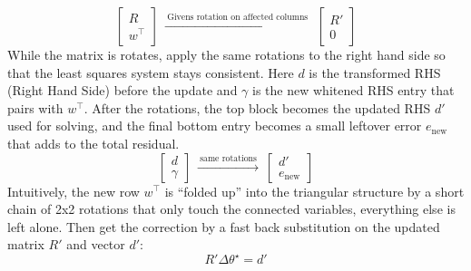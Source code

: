 $$
    \begin{bmatrix} R\\ w^\top \end{bmatrix}
    \ \xrightarrow{\ \text{Givens rotation on affected columns}\ }\ 
    \begin{bmatrix} R'\\ 0 \end{bmatrix}
$$
While the matrix is rotates, apply the same rotations to the right hand side so that the least squares system stays consistent. Here $d$ is the transformed RHS (Right Hand Side) before the update and $\gamma$ is the new whitened RHS entry that pairs with $w^\top$. After the rotations, the top block becomes the updated RHS $d'$ used for solving, and the final bottom entry becomes a small leftover error $e_{\text{new}}$ that adds to the total residual. 
$$
    \begin{bmatrix} d\\ \gamma \end{bmatrix}
    \ \xrightarrow{\ \text{same rotations}\ }\ 
    \begin{bmatrix} d'\\ e_{\text{new}} \end{bmatrix}
$$
Intuitively, the new row $w^\top$ is ``folded up'' into the triangular structure by a short chain of 2x2 rotations that only touch the connected variables, everything else is left alone. Then get the correction by a fast back substitution on the updated matrix $R'$ and vector $d'$:
$$
    R'\Delta\theta^\star = d'
$$




